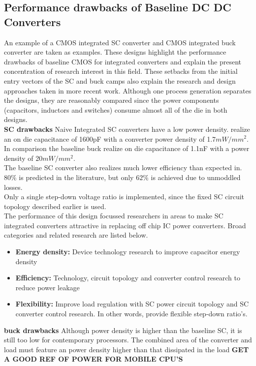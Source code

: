 \documentclass[letterpaper,twocolumn,10pt]{article}
\begin{document}
\subsection{Performance drawbacks of Baseline DC DC Converters}
An example of a CMOS integrated SC converter \cite{Viraj2007} and CMOS integrated buck converter \cite{Alimadadi2008} are taken as examples. These designs highlight the performance drawbacks of baseline CMOS for integrated converters and explain the present concentration of research interest in this field. These setbacks from the initial entry vectors of the SC and buck camps also explain the research and design approaches taken in more recent work. Although one process generation separates the designs, they are reasonably compared since the power components (capacitors, inductors and switches) consume almost all of the die in both designs.\\
\textbf{SC drawbacks} Naive Integrated SC converters have a low power density. \cite{Viraj2007} realize an on die capacitance of 1600pF with a converter power density of 1.7$mW/mm^2$. In comparison  the baseline buck \cite{Alimadadi2008} realize on die capacitance of 1.1nF with a power density of 20$mW/mm^2$.\\
The baseline SC converter also realizes much lower efficiency than expected in\cite{Viraj2007}. $80\%$ is predicted in the literature, but only $62\%$ is achieved due to unmoddled losses.\\
Only a single step-down voltage ratio is implemented, since the fixed SC circuit topology described earlier is used.\\
The performance of this design focussed researchers in areas to make SC integrated converters attractive in replacing off chip IC power converters. Broad categories and related research are listed below.\\
\begin{itemize}
\item \textbf{Energy density: }Device technology research to improve capacitor energy density
\item \textbf{Efficiency: }Technology, circuit topology and converter control research to reduce power leakage
\item \textbf{Flexibility: }Improve load regulation with SC power circuit topology and SC converter control research. In other words, provide flexible step-down ratio's. 
\end{itemize}
\textbf{buck drawbacks} Although power density is higher than the baseline SC, it is still too low for contemporary processors. The combined area of the converter and load must feature an power density higher than that dissipated in the load \textbf{GET A GOOD REF OF POWER FOR MOBILE CPU'S}\\
\end{document}
